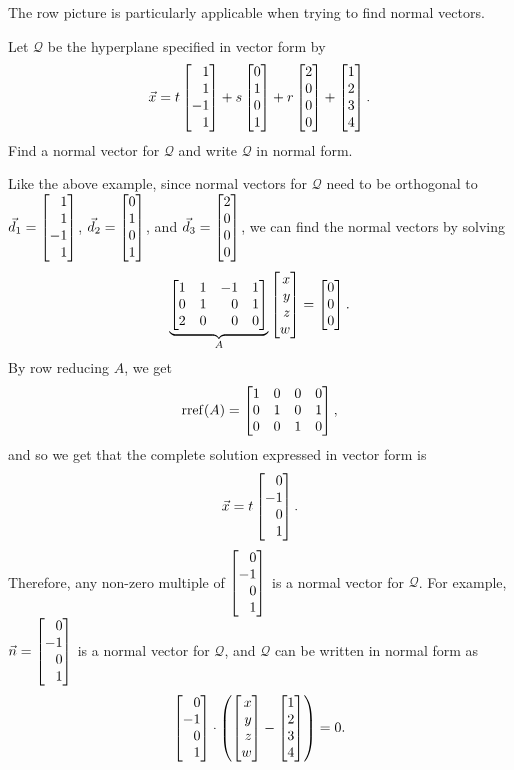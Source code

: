 The row picture is particularly applicable when trying to find normal vectors.

\begin{example}
	Let $\mathcal Q$ be the hyperplane specified in vector form by
	\[
		\vec x=t\mat{1\\1\\-1\\1}+s\mat{0\\1\\0\\1}+r\mat{2\\0\\0\\0}+\mat{1\\2\\3\\4}.
	\]
	Find a normal vector for $\mathcal Q$ and write $\mathcal Q$ in normal form.

	Like the above example, since normal vectors for $\mathcal Q$ need to be orthogonal to $\vec d_1=\mat{1\\1\\-1\\1}$, $\vec d_2=\mat{0\\1\\0\\1}$, and $\vec d_3=\mat{2\\0\\0\\0}$, we can find the normal vectors by solving
	\[
	\underbrace{\mat{1&1&-1&1\\0&1&0&1\\2&0&0&0}}_A\mat{x\\y\\z\\w}=\mat{0\\0\\0}.
    \]
    By row reducing $A$, we get
    \[
        \Rref(A) = \mat{1&0&0&0\\0&1&0&1\\0&0&1&0},
    \]
    and so we get that the complete solution expressed in vector form is
    \[
        \vec x = t\mat{0\\-1\\0\\1}.
	\]
    Therefore, any non-zero multiple of $\mat{0\\-1\\0\\1}$ is a normal vector for $\mathcal Q$. For example, $\vec n =\mat{0\\-1\\0\\1}$ is a normal vector for $\mathcal Q$, and $\mathcal Q$ can be written in normal form as
    \[
	    \mat{0\\-1\\0\\1}\cdot\left(\mat{x\\y\\z\\w}-\mat{1\\2\\3\\4}\right)=0.
    \]
\end{example}



